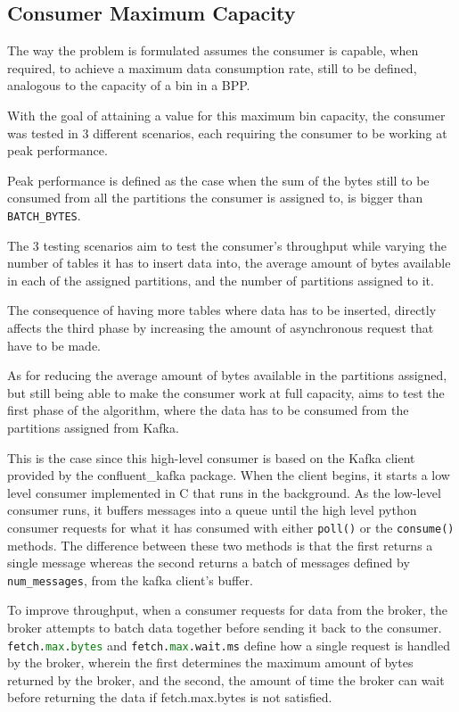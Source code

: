 \subsection{Consumer Maximum Capacity}
\label{c3subsub:consumer_maximum_capacity}

The way the problem is formulated assumes the consumer is capable, when
required, to achieve a maximum data consumption rate, still to be defined,
analogous to the capacity of a bin in a BPP.

With the goal of attaining a value for this maximum bin capacity, the consumer
was tested in 3 different scenarios, each requiring the consumer to be working
at peak performance.

Peak performance is defined as the case when the sum of the bytes still to be
consumed from all the partitions the consumer is assigned to, is bigger than
\lstinline[language=Python]{BATCH_BYTES}.

The 3 testing scenarios aim to test the consumer's throughput while varying the
number of tables it has to insert data into, the average amount of bytes
available in each of the assigned partitions, and the number of partitions
assigned to it.

The consequence of having more tables where data has to be inserted, directly
affects the third phase by increasing the amount of asynchronous request that
have to be made.

As for reducing the average amount of bytes available in the partitions
assigned, but still being able to make the consumer work at full capacity, aims
to test the first phase of the algorithm, where the data has to be consumed from
the partitions assigned from Kafka.

This is the case since this high-level consumer is based on the Kafka client
provided by the confluent\_kafka package. When the client begins, it starts a
low level consumer implemented in C that runs in the background. As the
low-level consumer runs, it buffers messages into a queue until the high level
python consumer requests for what it has consumed with either
\lstinline[language=Python]{poll()} or the
\lstinline[language=Python]{consume()} methods. The difference between these two
methods is that the first returns a single message whereas the second returns a
batch of messages defined by \lstinline[language=Python]{num_messages}, from the
kafka client's buffer. 

To improve throughput, when a consumer requests for data from the broker, the
broker attempts to batch data together before sending it back to the consumer.
\lstinline[language=Python]{fetch.max.bytes} and
\lstinline[language=Python]{fetch.max.wait.ms} define how a single request is
handled by the broker, wherein the first determines the maximum amount of bytes
returned by the broker, and the second, the amount of time the broker can wait
before returning the data if fetch.max.bytes is not satisfied.

